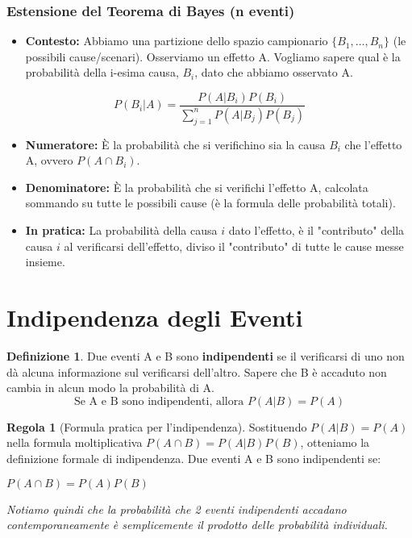 \documentclass[a4paper, 11pt]{article}
\theoremstyle{definition}
\newtheorem{definizione}{Definizione}[section]
\newtheorem{regola}{Regola}[section]
\begin{document}
\subsubsection*{Estensione del Teorema di Bayes (n eventi)}
\begin{itemize}
    \item \textbf{Contesto:} Abbiamo una partizione dello spazio campionario $\{B_1, \dots, B_n\}$ (le possibili cause/scenari). Osserviamo un effetto A. Vogliamo sapere qual è la probabilità della i-esima causa, $B_i$, dato che abbiamo osservato A.
\end{itemize}
\begin{formulabox}[title={Teorema di Bayes (forma generale)}]
    \[ P(B_i|A) = \frac{P(A|B_i)P(B_i)}{\sum_{j=1}^{n} P(A|B_j)P(B_j)} \]
\end{formulabox}
\begin{itemize}
    \item \textbf{Numeratore:} È la probabilità che si verifichino sia la causa $B_i$ che l'effetto A, ovvero $P(A \cap B_i)$.
    \item \textbf{Denominatore:} È la probabilità che si verifichi l'effetto A, calcolata sommando su tutte le possibili cause (è la formula delle probabilità totali).
    \item \textbf{In pratica:} La probabilità della causa $i$ dato l'effetto, è il "contributo" della causa $i$ al verificarsi dell'effetto, diviso il "contributo" di tutte le cause messe insieme.
\end{itemize}

\section{Indipendenza degli Eventi}

\begin{definizione}
Due eventi A e B sono \textbf{indipendenti} se il verificarsi di uno non dà alcuna informazione sul verificarsi dell'altro. Sapere che B è accaduto non cambia in alcun modo la probabilità di A.
\[ \text{Se A e B sono indipendenti, allora } P(A|B) = P(A) \]
\end{definizione}

\begin{regola}[Formula pratica per l'indipendenza]
Sostituendo $P(A|B) = P(A)$ nella formula moltiplicativa $P(A \cap B) = P(A|B)P(B)$, otteniamo la definizione formale di indipendenza. Due eventi A e B sono indipendenti se:
\begin{formulabox}
    $P(A \cap B) = P(A)P(B)$
\end{formulabox}
\textit{Notiamo quindi che la probabilità che 2 eventi indipendenti accadano contemporaneamente è semplicemente il prodotto delle probabilità individuali.}
\end{regola}
\end{document}
